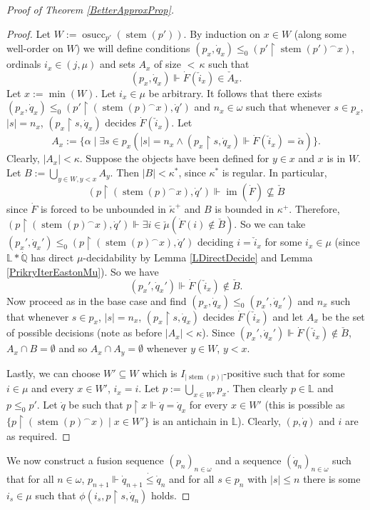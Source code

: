 \documentclass[a4paper]{amsart}
\theoremstyle{definition}
\theoremstyle{remark}
\theoremstyle{plain}
\numberwithin{mydef}{section}
\DeclareMathOperator{\im}{im}
\DeclareMathOperator{\stem}{stem}
\DeclareMathOperator{\osucc}{osucc}
\newcommand{\dL}{\mathbb{L}}
\newcommand{\dQ}{\mathbb{Q}}
\newcommand{\uhr}{\upharpoonright}
\begin{document}
\begin{proof}[Proof of Theorem \ref{BetterApproxProp}]
		\begin{proof}
			Let $W:=\osucc_{p'}(\stem(p'))$. By induction on $x\in W$ (along some well-order on $W$) we will define conditions $(p_x,\dot{q}_x)\leq_0(p'\uhr\stem(p')^{\frown}x)$, ordinals $i_x\in(j,\mu)$ and sets $A_x$ of size ${<}\,\kappa$ such that
			$$(p_x,\dot{q}_x)\Vdash\dot{F}(\check{i}_x)\in\check{A}_x.$$
			Let $x:=\min(W)$. Let $i_x\in\mu$ be arbitrary. It follows that there exists $(p_x,\dot{q}_x)\leq_0(p'\uhr(\stem(p)^{\frown}x),\dot{q}')$ and $n_x\in\omega$ such that whenever $s\in p_x$, $|s|=n_x$, $(p_x\uhr s,\dot{q}_x)$ decides $\dot{F}(\check{i}_x)$. Let
			$$A_x:=\{\alpha\;|\;\exists s\in p_x(|s|=n_x\wedge(p_x\uhr s,\dot{q}_x)\Vdash\dot{F}(\check{i}_x)=\check{\alpha})\}.$$
			Clearly, $|A_x|<\kappa$. Suppose the objects have been defined for $y\in x$ and $x$ is in $W$. Let $B:=\bigcup_{y\in W,y<x}A_y$. Then $|B|<\kappa^*$, since $\kappa^*$ is regular. In particular,
			$$(p\uhr(\stem(p)^{\frown}x),\dot{q}')\Vdash\im(\dot{F})\not\subseteq\check{B}$$
			since $\dot{F}$ is forced to be unbounded in $\check{\kappa}^+$ and $B$ is bounded in $\kappa^+$. Therefore, $(p\uhr(\stem(p)^{\frown}x),\dot{q}')\Vdash\exists i\in\check{\mu}(\dot{F}(i)\notin\check{B})$. So we can take $(p_x',\dot{q}_x')\leq_0(p\uhr(\stem(p)^{\frown}x),\dot{q}')$ deciding $i=\check{i}_x$ for some $i_x\in\mu$ (since $\dL*\dot{\dQ}$ has direct $\mu$-decidability by Lemma \ref{LDirectDecide} and Lemma \ref{PrikryIterEastonMu}). So we have
			$$(p_x',\dot{q}_x')\Vdash\dot{F}(\check{i}_x)\notin\check{B}.$$
			Now proceed as in the base case and find $(p_x,\dot{q}_x)\leq_0(p_x',\dot{q}_x')$ and $n_x$ such that whenever $s\in p_x$, $|s|=n_x$, $(p_x\uhr s,\dot{q}_x)$ decides $\dot{F}(\check{i}_x)$ and let $A_x$ be the set of possible decisions (note as before $|A_x|<\kappa$). Since $(p_x',\dot{q}_x')\Vdash\dot{F}(\check{i}_x)\notin\check{B}$, $A_x\cap B=\emptyset$ and so $A_x\cap A_y=\emptyset$ whenever $y\in W$, $y<x$.
			
			Lastly, we can choose $W'\subseteq W$ which is $I_{|\stem(p)|}$-positive such that for some $i\in\mu$ and every $x\in W'$, $i_x=i$. Let $p:=\bigcup_{x\in W'}p_x$. Then clearly $p\in\dL$ and $p\leq_0p'$. Let $\dot{q}$ be such that $p\uhr x\Vdash\dot{q}=\dot{q}_x$ for every $x\in W'$ (this is possible as $\{p\uhr (\stem(p)^{\frown}x)\;|\;x\in W'\}$ is an antichain in $\dL$). Clearly, $(p,\dot{q})$ and $i$ are as required.
		\end{proof}
		
		We now construct a fusion sequence $(p_n)_{n\in\omega}$ and a sequence $(\dot{q}_n)_{n\in\omega}$ such that for all $n\in\omega$, $p_{n+1}\Vdash\dot{q}_{n+1}\dot{\leq}\dot{q}_n$ and for all $s\in p_n$ with $|s|\leq n$ there is some $i_s\in\mu$ such that $\phi(i_s,p\uhr s,\dot{q}_n)$ holds.
		

\end{proof}
\end{document}
